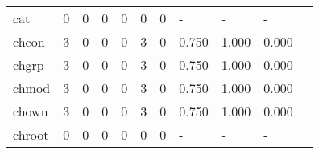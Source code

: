\begin{longtable}{lp{1.20cm}p{1.20cm}p{1.20cm}p{1.20cm}p{1.20cm}p{1.20cm}p{1.20cm}p{1.20cm}p{1.20cm}p{1.20cm}}
cat       &                                     0 &                                                  0 &                                                  0 &                                                  0 &                                                  0 &                                                  0 &                                             - &                                                  - &                                                  - \\
chcon     &                                     3 &                                                  0 &                                                  0 &                                                  0 &                                                  3 &                                                  0 &                                         0.750 &                                              1.000 &                                              0.000 \\
chgrp     &                                     3 &                                                  0 &                                                  0 &                                                  0 &                                                  3 &                                                  0 &                                         0.750 &                                              1.000 &                                              0.000 \\
chmod     &                                     3 &                                                  0 &                                                  0 &                                                  0 &                                                  3 &                                                  0 &                                         0.750 &                                              1.000 &                                              0.000 \\
chown     &                                     3 &                                                  0 &                                                  0 &                                                  0 &                                                  3 &                                                  0 &                                         0.750 &                                              1.000 &                                              0.000 \\
chroot    &                                     0 &                                                  0 &                                                  0 &                                                  0 &                                                  0 &                                                  0 &                                             - &                                                  - &                                                  - \\

\end{longtable}
